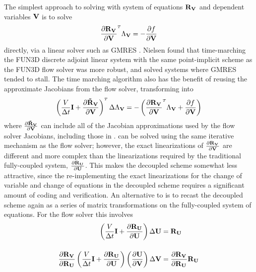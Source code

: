 The simplest approach to solving  with system of equations
$\mathbf R_{{\mathbf V}_{}}$ and dependent variables $\mathbf V$ is to solve
\begin{equation}
  \pd{\rv{}}{\mv}^{\mathsmaller T}\adjlam{\mv} = -\pd{f}{\mv}
  \label{v-adj}
\end{equation}
directly, via a linear solver such as GMRES \cite{saad1986gmres}.  Nielsen
\cite{nielsenPhD} found that time-marching the FUN3D discrete adjoint linear
system with the same point-implicit scheme as the FUN3D flow solver was more
robust, and solved systems where GMRES tended to stall.  The time marching
algorithm also has the benefit of reusing the approximate Jacobians from the
flow solver, transforming  into
\begin{equation}
  \left(
    \frac{V}{\Delta t} \mi + \drvdv
  \right)^{\mathsmaller T}
  \Delta \adjlam{\mv}
  =
  -\left(\pd{\rv{}}{\mv}^{\mathsmaller T}\adjlam{\mv} + \pd{f}{\mv} \right)
  \label{v-adj-time}
\end{equation}
where $\frac{\partial \mathbf{\tilde{R}_{\mathbf V}}}{\partial \mathbf V}$ can include all of the Jacobian approximations used by the flow
solver Jacobians, including those in .
 can be solved using the same iterative mechanism
as the flow solver; however, the exact linearizations of $\frac{\partial \mathbf R_{{\mathbf V}_{}}}{\partial \mathbf V}$
are different and more complex than the linearizations required by the
traditional fully-coupled system, $\frac{\partial \mathbf R_{{\mathbf U}_{}}}{\partial \mathbf U}$.  This makes the decoupled
scheme somewhat less attractive, since the re-implementing the exact
linearizations for the change of variable and change of equations in the
decoupled scheme requires a significant amount of coding and verification.  An
alternative to  is to recast the decoupled scheme again as a
series of matrix transformations on the fully-coupled system of equations.  For
the flow solver this involves
\begin{equation}
  \begin{aligned}
    \left( \frac{V}{\Delta t} \mathbf I + \frac{\partial \mathbf R_{{\mathbf U}_{}}}{\partial \mathbf U} \right) \Delta \mathbf U &= \mathbf R_{{\mathbf U}_{}} \\[12pt]
    \frac{\partial \mathbf R_{{\mathbf V}_{}}}{\partial \mathbf R_{{\mathbf U}_{}}}
    \left( \frac{V}{\Delta t} \mathbf I + \frac{\partial \mathbf R_{{\mathbf U}_{}}}{\partial \mathbf U} \right)
    \left( \frac{\partial \mathbf U}{\partial \mathbf V} \right) \Delta \mathbf V
    &= 
    \frac{\partial \mathbf R_{{\mathbf V}_{}}}{\partial \mathbf R_{{\mathbf U}_{}}} \mathbf R_{{\mathbf U}_{}}
  \end{aligned}
  \label{fc-to-dc-flow}
\end{equation}
